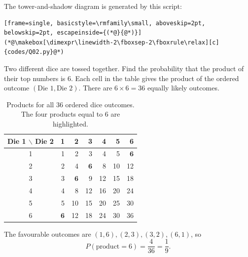 \begin{enumerate}[label={},leftmargin=0pt,itemsep=9pt]
The tower-and-shadow diagram is generated by this script:
\begin{lstlisting}[frame=single, basicstyle=\rmfamily\small, aboveskip=2pt, belowskip=2pt, escapeinside={(*@}{@*)}]
(*@\makebox[\dimexpr\linewidth-2\fboxsep-2\fboxrule\relax][c]{codes/Q02.py}@*)
\end{lstlisting}
\newpage
\setcounter{qcurrent}{3}\setcounter{equation}{0}
 Two different dice are tossed together. Find the probability that the product of their top numbers is $6$.
\solution Each cell in the table gives the product of the ordered outcome $(\text{Die 1},\text{Die 2})$. There are $6\times6=36$ equally likely outcomes.
\begin{table}[H]\centering\small
\caption{Products for all 36 ordered dice outcomes. The four products equal to 6 are highlighted.}
\setlength{\tabcolsep}{5pt}
\begin{tabular}{c|rrrrrr}
\toprule
Die 1 $\backslash$ Die 2 & 1 & 2 & 3 & 4 & 5 & 6\\\midrule
1 & 1 & 2 & 3 & 4 & 5 & $\mathbf{6}$\\
2 & 2 & 4 & $\mathbf{6}$ & 8 & 10 & 12\\
3 & 3 & $\mathbf{6}$ & 9 & 12 & 15 & 18\\
4 & 4 & 8 & 12 & 16 & 20 & 24\\
5 & 5 & 10 & 15 & 20 & 25 & 30\\
6 & $\mathbf{6}$ & 12 & 18 & 24 & 30 & 36\\
\bottomrule
\end{tabular}\end{table}
The favourable outcomes are $(1,6),(2,3),(3,2),(6,1)$, so
\begin{equation}
P(\text{product}=6)=\frac4{36}=\boxed{\frac19}.
\end{equation}




\end{enumerate}

